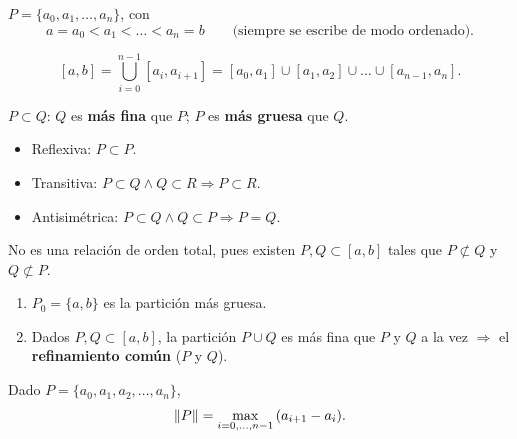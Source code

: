 \documentclass[11pt,a4paper]{article}
\begin{document}
\begin{notacion}
$P=\{a_0,a_1,\dots,a_n\}$, con
\[
  a=a_0<a_1<\dots<a_n=b \qquad \text{(siempre se escribe de modo ordenado).}
\]
\end{notacion}

\begin{center}
\end{center}

\[
  [a,b]=\bigcup_{i=0}^{n-1}[a_i,a_{i+1}]
  =[a_0,a_1]\cup[a_1,a_2]\cup\dots\cup[a_{n-1},a_n].
\]

\begin{definicion}
$P\subset Q$: $Q$ es \textbf{más fina} que $P$; $P$ es \textbf{más gruesa} que $Q$.
\end{definicion}

\begin{itemize}
  \item Reflexiva: $P\subset P$.
  \item Transitiva: $P\subset Q \wedge Q\subset R \Rightarrow P\subset R$.
  \item Antisimétrica: $P\subset Q \wedge Q\subset P \Rightarrow P=Q$.
\end{itemize}

No es una relación de orden total, pues existen $P,Q\subset[a,b]$ tales que $P\not\subset Q$ y $Q\not\subset P$.

\begin{observacion}\leavevmode
\begin{enumerate}
  \item $P_0=\{a,b\}$ es la partición más gruesa.
  \item Dados $P,Q\subset[a,b]$, la partición $P\cup Q$ es más fina que $P$ y $Q$ a la vez $\Rightarrow$ el \textbf{refinamiento común} ($P$ y $Q$).
\end{enumerate}
\end{observacion}

\begin{definicion}[Norma]
Dado $P=\{a_0,a_1,a_2,\dots,a_n\}$,
\[
  \lVert P\rVert = \max_{i=0,\dots,n-1}\,(a_{i+1}-a_i).
\]
\end{definicion}
\end{document}
